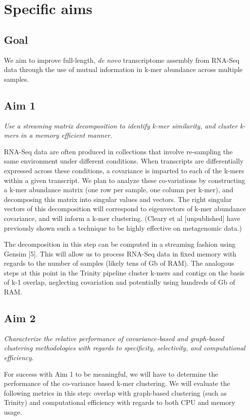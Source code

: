 \documentclass[11pt]{article}
\begin{document}
\section{Specific aims}
\subsection{Goal}
We aim to improve full-length, {\sl de novo} transcriptome assembly from RNA-Seq data through the use of mutual information in k-mer abundance across multiple samples.


\subsection{Aim 1}
{\sl Use a streaming matrix decomposition to identify k-mer similarity, and cluster k-mers in a memory efficient manner.}

\noindent RNA-Seq data are often produced in collections that involve re-sampling the same environment under different conditions. When transcripts are differentially expressed across these conditions, a covariance is imparted to each of the k-mers within a given transcript. We plan to analyze these co-variations by constructing a k-mer abundance matrix (one row per sample, one column per k-mer), and decomposing this matrix into singular values and vectors. The right singular vectors of this decomposition will correspond to eigenvectors of k-mer abundance covariance, and will inform a k-mer clustering. (Cleary et al [unpublished] have previously shown such a technique to be highly effective on metagenomic data.)

The decomposition in this step can be computed in a streaming fashion using Gensim [5]. This will allow us to process RNA-Seq data in fixed memory with regards to the number of samples (likely tens of Gb of RAM). The analogous steps at this point in the Trinity pipeline cluster k-mers and contigs on the basis of k-1 overlap, neglecting covariation and potentially using hundreds of Gb of RAM.

\subsection{Aim 2}
{\sl Characterize the relative performance of covariance-based and graph-based clustering methodologies with regards to specificity, selectivity, and computational efficiency.}

\noindent For success with Aim 1 to be meaningful, we will have to determine the performance of the co-variance based k-mer clustering. We will evaluate the following metrics in this step: overlap with graph-based clustering (such as Trinity) and computational efficiency with regards to both CPU and memory usage.
\end{document}
